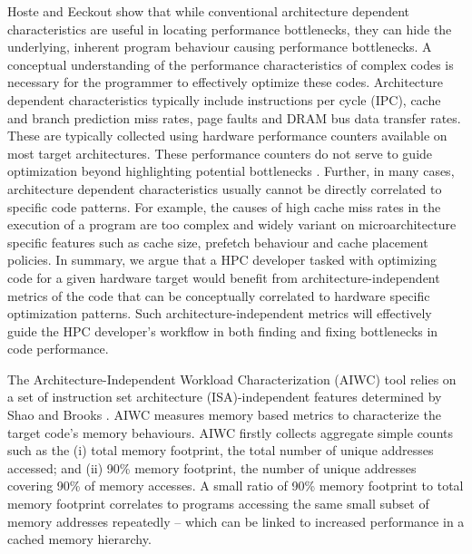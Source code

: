 \documentclass[review=false, sigchi]{acmart}
\begin{document}
	Hoste and Eeckout \cite{hoste2007microarchitecture} show that while conventional architecture dependent characteristics are useful in locating performance bottlenecks, they can hide the underlying, inherent program behaviour causing performance bottlenecks. A conceptual understanding of the performance characteristics of complex codes is necessary for the programmer to effectively optimize these codes. Architecture dependent characteristics typically include instructions per cycle (IPC), cache and branch prediction miss rates, page faults and DRAM bus data transfer rates. These are typically collected using hardware performance counters available on most target architectures. These performance counters do not serve to guide optimization beyond highlighting potential bottlenecks \cite{hoste2007microarchitecture, ganesan2008performance}. Further, in many cases, architecture dependent characteristics usually cannot be directly correlated to specific code patterns. For example, the causes of high cache miss rates in the execution of a program are too complex and widely variant on microarchitecture specific features such as cache size, prefetch behaviour and cache placement policies. In summary, we argue that a HPC developer tasked with optimizing code for a given hardware target would benefit from architecture-independent metrics of the code that can be conceptually correlated to hardware specific optimization patterns. Such architecture-independent metrics will effectively guide the HPC developer's workflow in both finding and fixing bottlenecks in code performance.
	
	The Architecture-Independent Workload Characterization (AIWC) tool \cite{beauaiwc} relies on a set of instruction set architecture (ISA)-independent features determined by Shao and Brooks \cite{shao2013isa}. AIWC measures memory based metrics to characterize the target code's memory behaviours. AIWC firstly collects aggregate simple counts such as the (i) total memory footprint, the total number of unique addresses accessed; and (ii) 90\% memory footprint, the number of unique addresses covering 90\% of memory accesses. A small ratio of 90\% memory footprint to total memory footprint correlates to programs accessing the same small subset of memory addresses repeatedly -- which can be linked to increased performance in a cached memory hierarchy.
	
\end{document}

